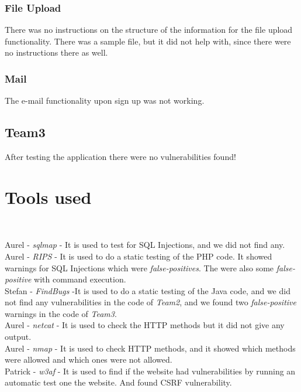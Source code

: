 \documentclass[headsepline,footsepline,footinclude=false,oneside,fontsize=11pt,paper=a4,listof=totoc,bibliography=totoc]{scrbook} %
\begin{document}
\subsection{File Upload} 
There was no instructions on the structure of the information for the file upload functionality. There was a sample file, but it did not help with, since there were no instructions there as well.

\subsection{Mail}
The e-mail functionality upon sign up was not working.


\section{Team3}

After testing the application there were no vulnerabilities found!

 

\chapter{Tools used} \

Aurel - \textit{sqlmap} - It is used to test for SQL Injections, and we did not find any.\\

Aurel - \textit{RIPS} - It is used to do a static testing of the PHP code. It showed warnings for SQL Injections which were \textit{false-positives}. The were also some \textit{false-positive} with command execution.\\

Stefan - \textit{FindBugs} -It is used to do a static testing of the Java code, and we did not find any vulnerabilities in the code of \textit{Team2}, and we found two \textit{false-positive} warnings in the code of \textit{Team3}.\\

Aurel - \textit{netcat} - It is used to check the HTTP methods but it did not give any output. \\

Aurel - \textit{nmap} - It is used to check HTTP methods, and it showed which methods were allowed and which ones were not allowed.\\

Patrick - \textit{w3af} - It is used to find if the website had vulnerabilities by running an automatic test one the website. And found CSRF vulnerability. \\
\end{document}
